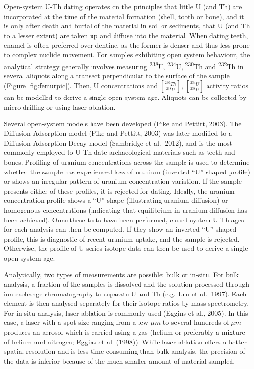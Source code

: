 \documentclass[]{elsarticle} %
\begin{document}
Open-system U-Th dating operates on the principles that little U (and Th) are incorporated at the time of the material formation (shell, tooth or bone), and it is only after death and burial of the material in soil or sediments, that U (and Th to a lesser extent) are taken up and diffuse into the material. When dating teeth, enamel is often preferred over dentine, as the former is denser and thus less prone to complex nuclide movement.
For samples exhibiting open system behaviour, the analytical strategy generally involves measuring \textsuperscript{238}U, \textsuperscript{234}U, \textsuperscript{230}Th and \textsuperscript{232}Th in several aliquots along a transect perpendicular to the surface of the sample (Figure \ref{fig:femurpic}). Then, U concentrations and \([\frac{^{230}Th}{^{238}U}]\), \([\frac{^{234}U}{^{238}U}]\) activity ratios can be modelled to derive a single open-system age. Aliquots can be collected by micro-drilling or using laser ablation.

Several open-system models have been developed (Pike and Pettitt, 2003). The Diffusion-Adsorption model (Pike and Pettitt, 2003) was later modified to a Diffusion-Adsorption-Decay model (Sambridge et al., 2012), and is the most commonly employed to U-Th date archaeological materials such as teeth and bones. Profiling of uranium concentrations across the sample is used to determine whether the sample has experienced loss of uranium (inverted ``U'' shaped profile) or shows an irregular pattern of uranium concentration variation. If the sample presents either of these profiles, it is rejected for dating. Ideally, the uranium concentration profile shows a ``U'' shape (illustrating uranium diffusion) or homogenous concentrations (indicating that equilibrium in uranium diffusion has been achieved). Once these tests have been performed, closed-system U-Th ages for each analysis can then be computed. If they show an inverted ``U'' shaped profile, this is diagnostic of recent uranium uptake, and the sample is rejected. Otherwise, the profile of U-series isotope data can then be used to derive a single open-system age.

Analytically, two types of measurements are possible: bulk or in-situ. For bulk analysis, a fraction of the samples is dissolved and the solution processed through ion exchange chromatography to separate U and Th (e.g. Luo et al., 1997). Each element is then analysed separately for their isotope ratios by mass spectrometry.
For in-situ analysis, laser ablation is commonly used (Eggins et al., 2005). In this case, a laser with a spot size ranging from a few \(\mu m\) to several hundreds of \(\mu m\) produces an aerosol which is carried using a gas (helium or preferably a mixture of helium and nitrogen; Eggins et al. (1998)).
While laser ablation offers a better spatial resolution and is less time consuming than bulk analysis, the precision of the data is inferior because of the much smaller amount of material sampled.
\end{document}
